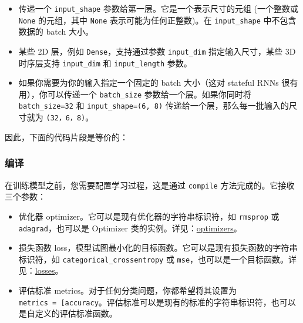 \begin{itemize}
\tightlist
\item
  传递一个 \texttt{input\_shape} 参数给第一层。它是一个表示尺寸的元组
  (一个整数或 \texttt{None} 的元组，其中 \texttt{None}
  表示可能为任何正整数)。在 \texttt{input\_shape} 中不包含数据的 batch
  大小。
\item
  某些 2D 层，例如 \texttt{Dense}，支持通过参数 \texttt{input\_dim}
  指定输入尺寸，某些 3D 时序层支持 \texttt{input\_dim} 和
  \texttt{input\_length} 参数。
\item
  如果你需要为你的输入指定一个固定的 batch 大小（这对 stateful RNNs
  很有用），你可以传递一个 \texttt{batch\_size}
  参数给一个层。如果你同时将 \texttt{batch\_size=32} 和
  \texttt{input\_shape=(6,\ 8)} 传递给一个层，那么每一批输入的尺寸就为
  \texttt{(32，6，8)}。
\end{itemize}

因此，下面的代码片段是等价的：

\begin{Shaded}
\begin{Highlighting}[]
\OperatorTok{=} 
\OperatorTok{=}\NormalTok{(}\NormalTok{,)))}
\end{Highlighting}
\end{Shaded}

\begin{Shaded}
\begin{Highlighting}[]
\OperatorTok{=} 
\OperatorTok{=}\NormalTok{))}
\end{Highlighting}
\end{Shaded}


\subsubsection{编译}\label{ux7f16ux8bd1}

在训练模型之前，您需要配置学习过程，这是通过 \texttt{compile}
方法完成的。它接收三个参数：

\begin{itemize}
\tightlist
\item
  优化器 optimizer。它可以是现有优化器的字符串标识符，如
  \texttt{rmsprop} 或 \texttt{adagrad}，也可以是 Optimizer
  类的实例。详见：\hyperref[optimizers]{optimizers}。
\item
  损失函数
  loss，模型试图最小化的目标函数。它可以是现有损失函数的字符串标识符，如
  \texttt{categorical\_crossentropy} 或
  \texttt{mse}，也可以是一个目标函数。详见：\hyperref[losses]{losses}。
\item
  评估标准 metrics。对于任何分类问题，你都希望将其设置为
  \texttt{metrics\ =\ {[}\textquotesingle{}accuracy\textquotesingle{}{]}}。评估标准可以是现有的标准的字符串标识符，也可以是自定义的评估标准函数。
\end{itemize}

